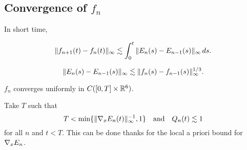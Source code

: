 \documentclass[11pt]{amsart}
\begin{document}
\subsection{Convergence of $f_n$}
\begin{lem}
In short time,
\begin{cond}
\item\[\|f_{n+1}(t)-f_n(t)\|_\infty\lesssim\int_0^t\|E_n(s)-E_{n-1}(s)\|_\infty\,ds.\]
\item\[\|E_n(s)-E_{n-1}(s)\|_\infty\lesssim\|f_n(s)-f_{n-1}(s)\|_\infty^{1/3}.\]
\item $f_n$ converges uniformly in $C([0,T]\times\mathbb{R}^6)$.
\end{cond}
\end{lem}
\begin{pfs}
\item
Take $T$ such that
\[T<\min\{\|\nabla_xE_n(t)\|_\infty^{-1},1\}\quad\text{and}\quad Q_n(t)\lesssim1\]
for all $n$ and $t<T$.
This can be done thanks for the local a priori bound for $\nabla_xE_n$.


\end{pfs}
\end{document}
